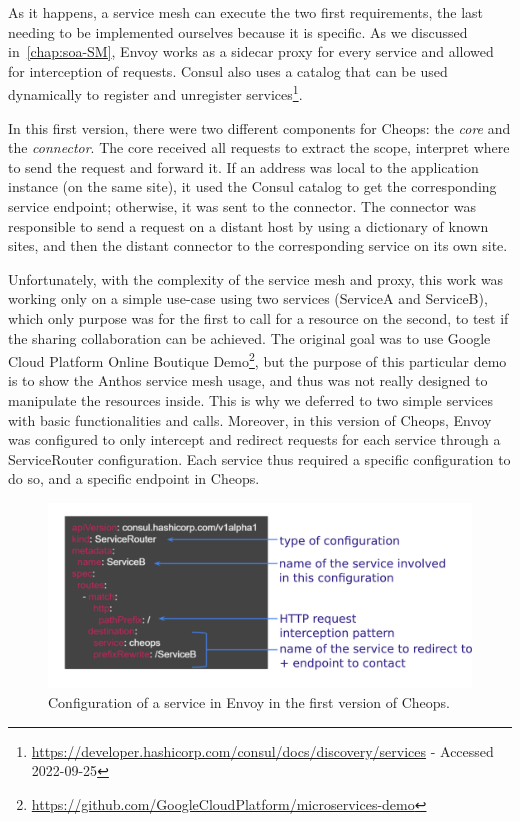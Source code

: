 As it happens, a service mesh can execute the two first requirements,
the last needing to be implemented ourselves because it is \scl
specific.
%
As we discussed in~\autoref{chap:soa-SM}, Envoy works as a sidecar
proxy for every service and allowed for interception of requests.
%
Consul also uses a catalog that can be used dynamically to register
and unregister
services\footnote{\url{https://developer.hashicorp.com/consul/docs/discovery/services}
  - Accessed 2022-09-25}.

In this first version, there were two different components for Cheops:
the \emph{core} and the \emph{connector}.
%
The core received all requests to extract the scope, interpret where
to send the request and forward it.
%
If an address was local to the application instance (on the same
site), it used the Consul catalog to get the corresponding service
endpoint; otherwise, it was sent to the connector.
%
The connector was responsible to send a request on a distant host by
using a dictionary of known sites, and then the distant connector to
the corresponding service on its own site.

Unfortunately, with the complexity of the service mesh and proxy, this
work was working only on a simple use-case using two services
(ServiceA and ServiceB), which only purpose was for the first to call
for a resource on the second, to test if the sharing collaboration can
be achieved.
%
The original goal was to use Google Cloud Platform Online Boutique
Demo\footnote{\url{https://github.com/GoogleCloudPlatform/microservices-demo}},
but the purpose of this particular demo is to show the Anthos service
mesh usage, and thus was not really designed to manipulate the
resources inside.
%
This is why we deferred to two simple services with basic
functionalities and calls.
%
Moreover, in this version of Cheops, Envoy was configured to only
intercept and redirect requests for each service through a
ServiceRouter configuration.
%
Each service thus required a specific configuration to do so, and a
specific endpoint in Cheops.

\begin{figure}[htbp]
  \centering
  \includegraphics[width=\textwidth]{figs/pdf/cheopsv1-config}
  \caption{Configuration of a service in Envoy in the first version of Cheops.}
  \label{fig:cheops-v1-config}
\end{figure}

